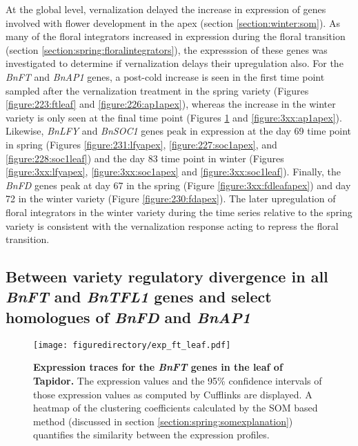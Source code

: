 \documentclass[12pt,]{book}
\begin{document}
At the global level, vernalization delayed the increase in expression of
genes involved with flower development in the apex (section
\ref{section:winter:som}). As many of the floral integrators increased
in expression during the floral transition (section
\ref{section:spring:floralintegrators}), the expresssion of these genes
was investigated to determine if vernalization delays their upregulation
also. For the \emph{BnFT} and \emph{BnAP1} genes, a post-cold increase
is seen in the first time point sampled after the vernalization
treatment in the spring variety (Figures \ref{figure:223:ftleaf} and
\ref{figure:226:ap1apex}), whereas the increase in the winter variety is
only seen at the final time point (Figures \ref{figure:3xx:ftleaf} and
\ref{figure:3xx:ap1apex}). Likewise, \emph{BnLFY} and \emph{BnSOC1}
genes peak in expression at the day 69 time point in spring (Figures
\ref{figure:231:lfyapex}, \ref{figure:227:soc1apex}, and
\ref{figure:228:soc1leaf}) and the day 83 time point in winter (Figures
\ref{figure:3xx:lfyapex}, \ref{figure:3xx:soc1apex} and
\ref{figure:3xx:soc1leaf}). Finally, the \emph{BnFD} genes peak at day
67 in the spring (Figure \ref{figure:3xx:fdleafapex}) and day 72 in the
winter variety (Figure \ref{figure:230:fdapex}). The later upregulation
of floral integrators in the winter variety during the time series
relative to the spring variety is consistent with the vernalization
response acting to repress the floral transition.

\subsection{\texorpdfstring{Between variety regulatory divergence in all
\emph{BnFT} and \emph{BnTFL1} genes and select homologues of \emph{BnFD}
and
\emph{BnAP1}}{Between variety regulatory divergence in all BnFT and BnTFL1 genes and select homologues of BnFD and BnAP1}}\label{section:winter:floraldifferences}

\begin{figure}[htbp]
\centering
\texttt{[image: figuredirectory/exp\_ft\_leaf.pdf]}
\caption{\textbf{Expression traces for the \emph{BnFT} genes in the leaf
of Tapidor.} The expression values and the 95\% confidence intervals of
those expression values as computed by Cufflinks are displayed. A
heatmap of the clustering coefficients calculated by the SOM based
method (discussed in section \ref{section:spring:somexplanation})
quantifies the similarity between the expression
profiles.}\label{figure:3xx:ftleaf}
\end{figure}
\end{document}
